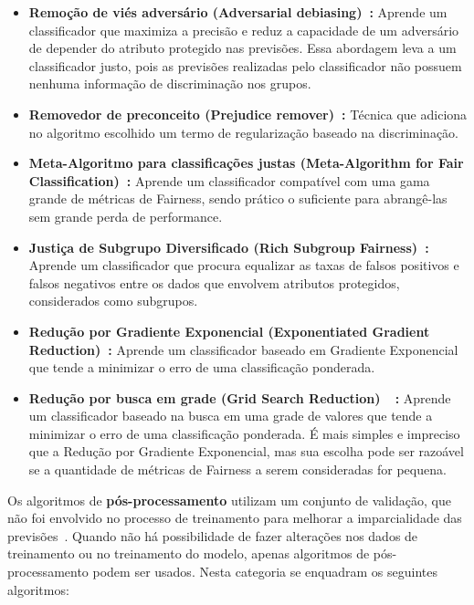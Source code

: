 \documentclass[Portugues,Final]{ic-tese-v3}
\begin{document}
\begin{itemize}
\item \textbf{Remoção de viés adversário (Adversarial debiasing)~\cite{Zhang_2018}:} Aprende um classificador que maximiza a precisão e reduz a capacidade de um adversário de depender do atributo protegido nas previsões. Essa abordagem leva a um classificador justo, pois as previsões realizadas pelo classificador não possuem nenhuma informação de discriminação nos grupos.

\item \textbf{Removedor de preconceito (Prejudice remover)~\cite{Feldman_2015}:} Técnica que adiciona no algoritmo escolhido um termo de regularização baseado na discriminação.

\item \textbf{Meta-Algoritmo para classificações justas (Meta-Algorithm for Fair Classification)~\cite{Celis_2019}:} Aprende um classificador compatível com uma gama grande de métricas de Fairness, sendo prático o suficiente para abrangê-las sem grande perda de performance.

\item \textbf{Justiça de Subgrupo Diversificado (Rich Subgroup Fairness)~\cite{Kearns_2018}:} Aprende um classificador que procura equalizar as taxas de falsos positivos e falsos negativos entre os dados que envolvem atributos protegidos, considerados como subgrupos.

\item \textbf{Redução por Gradiente Exponencial (Exponentiated Gradient Reduction)~\cite{Agarwal_2018}:} Aprende um classificador baseado em Gradiente Exponencial que tende a minimizar o erro de uma classificação ponderada.

\item \textbf{Redução por busca em grade (Grid Search Reduction)~\cite{Agarwal_2018}~\cite{Agarwal_2019}:} Aprende um classificador baseado na busca em uma grade de valores que tende a minimizar o erro de uma classificação ponderada. É mais simples e impreciso que a Redução por Gradiente Exponencial, mas sua escolha pode ser razoável se a quantidade de métricas de Fairness a serem consideradas for pequena.

\end{itemize}

Os algoritmos de \textbf{pós-processamento} utilizam um conjunto de validação, que não foi envolvido no processo de treinamento para melhorar a imparcialidade das previsões~\cite{dAlessandro_2017}. Quando não há possibilidade de fazer alterações nos dados de treinamento ou no treinamento do modelo, apenas algoritmos de pós-processamento podem ser usados. Nesta categoria se enquadram os seguintes algoritmos:
\end{document}
